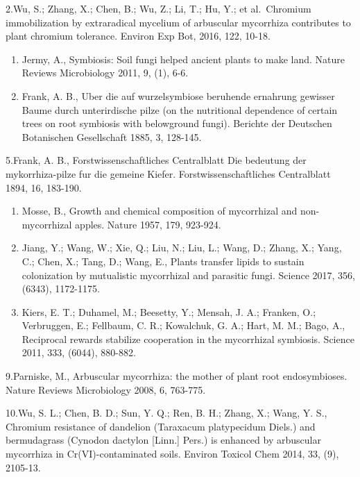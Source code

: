 \documentclass[]{book}
\begin{document}
2.Wu, S.; Zhang, X.; Chen, B.; Wu, Z.; Li, T.; Hu, Y.; et al.~Chromium immobilization by extraradical mycelium of arbuscular mycorrhiza contributes to plant chromium tolerance. Environ Exp Bot, 2016, 122, 10-18.

\begin{enumerate}
\def\labelenumi{\arabic{enumi}.}
\setcounter{enumi}{2}
\item
  Jermy, A., Symbiosis: Soil fungi helped ancient plants to make land. Nature Reviews Microbiology 2011, 9, (1), 6-6.
\item
  Frank, A. B., Uber die auf wurzelsymbiose beruhende ernahrung gewisser Baume durch unterirdische pilze (on the nutritional dependence of certain trees on root symbiosis with belowground fungi). Berichte der Deutschen Botanischen Gesellschaft 1885, 3, 128-145.
\end{enumerate}

5.Frank, A. B., Forstwissenschaftliches Centralblatt Die bedeutung der mykorrhiza-pilze fur die gemeine Kiefer. Forstwissenschaftliches Centralblatt 1894, 16, 183-190.

\begin{enumerate}
\def\labelenumi{\arabic{enumi}.}
\setcounter{enumi}{5}
\item
  Mosse, B., Growth and chemical composition of mycorrhizal and non-mycorrhizal apples. Nature 1957, 179, 923-924.
\item
  Jiang, Y.; Wang, W.; Xie, Q.; Liu, N.; Liu, L.; Wang, D.; Zhang, X.; Yang, C.; Chen, X.; Tang, D.; Wang, E., Plants transfer lipids to sustain colonization by mutualistic mycorrhizal and parasitic fungi. Science 2017, 356, (6343), 1172-1175.
\item
  Kiers, E. T.; Duhamel, M.; Beesetty, Y.; Mensah, J. A.; Franken, O.; Verbruggen, E.; Fellbaum, C. R.; Kowalchuk, G. A.; Hart, M. M.; Bago, A., Reciprocal rewards stabilize cooperation in the mycorrhizal symbiosis. Science 2011, 333, (6044), 880-882.
\end{enumerate}

9.Parniske, M., Arbuscular mycorrhiza: the mother of plant root endosymbioses. Nature Reviews Microbiology 2008, 6, 763-775.

10.Wu, S. L.; Chen, B. D.; Sun, Y. Q.; Ren, B. H.; Zhang, X.; Wang, Y. S., Chromium resistance of dandelion (Taraxacum platypecidum Diels.) and bermudagrass (Cynodon dactylon {[}Linn.{]} Pers.) is enhanced by arbuscular mycorrhiza in Cr(VI)-contaminated soils. Environ Toxicol Chem 2014, 33, (9), 2105-13.
\end{document}

